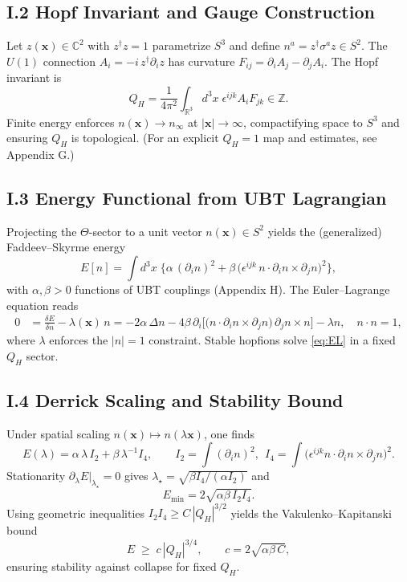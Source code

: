 \subsection*{I.2 Hopf Invariant and Gauge Construction}
Let $z(\mathbf{x})\in\mathbb{C}^2$ with $z^\dagger z=1$ parametrize $S^3$ and define $n^a=z^\dagger\sigma^a z\in S^2$.
The $U(1)$ connection $A_i=-i\,z^\dagger\partial_i z$ has curvature $F_{ij}=\partial_i A_j-\partial_j A_i$. 
The Hopf invariant is
\begin{equation}
Q_H=\frac{1}{4\pi^2}\int_{\mathbb{R}^3} d^3x\; \epsilon^{ijk} A_i F_{jk}\in\mathbb{Z}.
\label{eq:HopfQ}
\end{equation}
Finite energy enforces $n(\mathbf{x})\to n_\infty$ at $|\mathbf{x}|\to\infty$, compactifying space to $S^3$ and ensuring $Q_H$ is topological. 
(For an explicit $Q_H{=}1$ map and estimates, see Appendix G.)

\subsection*{I.3 Energy Functional from UBT Lagrangian}
Projecting the $\Theta$-sector to a unit vector $n(\mathbf{x})\in S^2$ yields the (generalized) Faddeev--Skyrme energy
\begin{equation}
E[n]=\int d^3x\;\Big\{\alpha\,(\partial_i n)^2+\beta\, \big(\epsilon^{ijk}\,n\cdot\partial_i n\times\partial_j n\big)^2 \Big\},
\label{eq:FSenergy}
\end{equation}
with $\alpha,\beta>0$ functions of UBT couplings (Appendix H). 
The Euler--Lagrange equation reads
\begin{align}
0&=\frac{\delta E}{\delta n}-\lambda(\mathbf{x})\,n
= -2\alpha\,\Delta n -4\beta\,\partial_i\Big[ \big(n\cdot\partial_i n\times\partial_j n\big)\, \partial_j n\times n \Big]-\lambda n,\quad n\cdot n=1,
\label{eq:EL}
\end{align}
where $\lambda$ enforces the $|n|=1$ constraint. 
Stable hopfions solve \eqref{eq:EL} in a fixed $Q_H$ sector.

\subsection*{I.4 Derrick Scaling and Stability Bound}
Under spatial scaling $n(\mathbf{x})\mapsto n(\lambda\mathbf{x})$, one finds
\begin{equation}
E(\lambda)=\alpha\,\lambda\,I_2+\beta\,\lambda^{-1} I_4,\qquad
I_2=\int (\partial_i n)^2,\ \ I_4=\int \big(\epsilon^{ijk}n\cdot\partial_i n\times\partial_j n\big)^2.
\end{equation}
Stationarity $\partial_\lambda E|_{\lambda_\star}=0$ gives $\lambda_\star=\sqrt{\beta I_4/(\alpha I_2)}$ and
\begin{equation}
E_{\min}=2\sqrt{\alpha\beta\,I_2 I_4}.
\end{equation}
Using geometric inequalities $I_2 I_4 \ge C\,|Q_H|^{3/2}$ yields the Vakulenko--Kapitanski bound
\begin{equation}
E \;\ge\; c\, |Q_H|^{3/4},\qquad c=2\sqrt{\alpha\beta\,C},
\label{eq:VK}
\end{equation}
ensuring stability against collapse for fixed $Q_H$.

